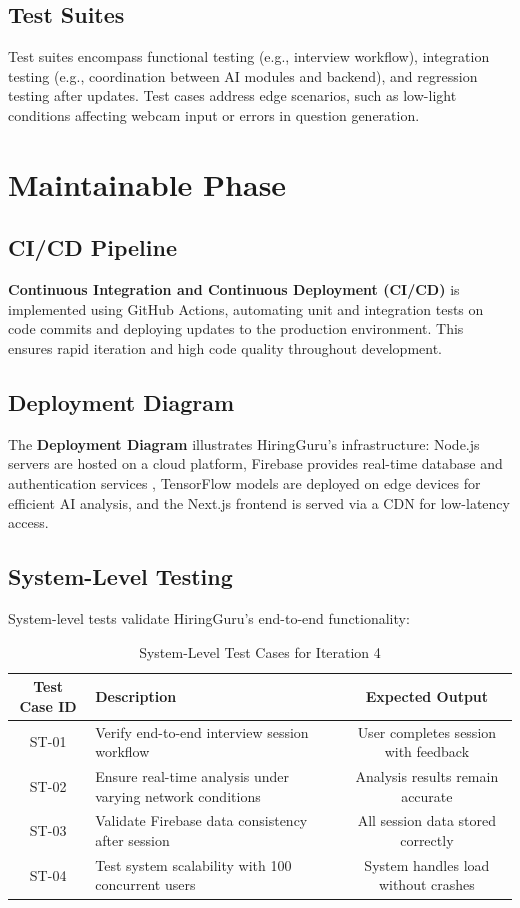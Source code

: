 \subsection{Test Suites}
Test suites encompass functional testing (e.g., interview workflow), integration testing (e.g., coordination between AI modules and backend), and regression testing after updates. Test cases address edge scenarios, such as low-light conditions affecting webcam input or errors in question generation.

\section{Maintainable Phase}

\subsection{CI/CD Pipeline}
\textbf{Continuous Integration and Continuous Deployment (CI/CD)} is implemented using GitHub Actions, automating unit and integration tests on code commits and deploying updates to the production environment. This ensures rapid iteration and high code quality throughout development.

\subsection{Deployment Diagram}
The \textbf{Deployment Diagram} illustrates HiringGuru’s infrastructure: Node.js servers are hosted on a cloud platform, Firebase provides real-time database and authentication services \cite{firebase2023docs}, TensorFlow models are deployed on edge devices for efficient AI analysis, and the Next.js frontend is served via a CDN for low-latency access.

\subsection{System-Level Testing}
System-level tests validate HiringGuru’s end-to-end functionality:

\begin{table}[!htbp]
\centering
\begin{tabular}{|c|p{6cm}|c|}
\hline
\textbf{Test Case ID} & \textbf{Description} & \textbf{Expected Output} \\
\hline
ST-01 & Verify end-to-end interview session workflow & User completes session with feedback \\
\hline
ST-02 & Ensure real-time analysis under varying network conditions & Analysis results remain accurate \\
\hline
ST-03 & Validate Firebase data consistency after session & All session data stored correctly \\
\hline
ST-04 & Test system scalability with 100 concurrent users & System handles load without crashes \\
\hline
\end{tabular}
\caption{System-Level Test Cases for Iteration 4}
\label{tab:system-test-cases}
\end{table}


